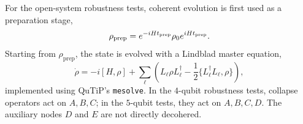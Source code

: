 \documentclass[aps,physrev,preprint,groupedaddress]{revtex4-2}
\begin{document}

For the open-system robustness tests, coherent evolution is first used
as a preparation stage,
\begin{equation}
    \rho_{\mathrm{prep}} = e^{-iHt_{\rm prep}}\rho_0e^{iHt_{\rm prep}} .
\end{equation}
Starting from $\rho_{\mathrm{prep}}$, the state is evolved with a Lindblad master equation,
\begin{equation}
    \dot\rho=-i[H,\rho]+
    \sum_\ell\left(L_\ell\rho L_\ell^\dagger-\frac12\{L_\ell^\dagger L_\ell,\rho\}\right),
\end{equation}
implemented using QuTiP's \texttt{mesolve}. In the $4$-qubit robustness tests, collapse operators act on $A,B,C$; in the $5$-qubit tests, they act on $A,B,C,D$. The auxiliary nodes $D$ and $E$ are not directly decohered.
\end{document}
